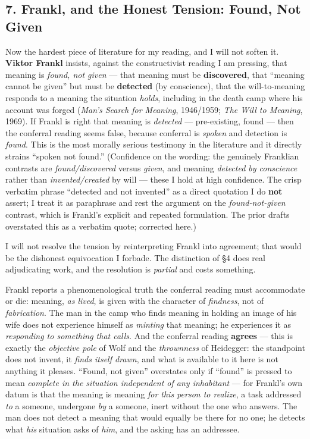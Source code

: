 \documentclass[11pt]{article}
\begin{document}
\subsection*{7. Frankl, and the Honest Tension: Found, Not Given}

Now the hardest piece of literature for my reading, and I will not soften it. \textbf{Viktor Frankl} insists, against the constructivist reading I am pressing, that meaning is \emph{found, not given} — that meaning must be \textbf{discovered}, that ``meaning cannot be given'' but must be \textbf{detected} (by conscience), that the will-to-meaning responds to a meaning the situation \emph{holds}, including in the death camp where his account was forged (\emph{Man's Search for Meaning}, 1946/\allowbreak{}1959; \emph{The Will to Meaning}, 1969). If Frankl is right that meaning is \emph{detected} — pre-existing, found — then the conferral reading seems false, because conferral is \emph{spoken} and detection is \emph{found}. This is the most morally serious testimony in the literature and it directly strains ``spoken not found.'' (Confidence on the wording: the genuinely Franklian contrasts are \emph{found/\allowbreak{}discovered} versus \emph{given}, and meaning \emph{detected by conscience} rather than \emph{invented/\allowbreak{}created} by will — these I hold at high confidence. The crisp verbatim phrase ``detected and not invented'' as a direct quotation I do \textbf{not} assert; I treat it as paraphrase and rest the argument on the \emph{found-not-given} contrast, which is Frankl's explicit and repeated formulation. The prior drafts overstated this as a verbatim quote; corrected here.)

I will not resolve the tension by reinterpreting Frankl into agreement; that would be the dishonest equivocation I forbade. The distinction of §4 does real adjudicating work, and the resolution is \emph{partial} and costs something.

Frankl reports a phenomenological truth the conferral reading must accommodate or die: meaning, \emph{as lived}, is given with the character of \emph{findness}, not of \emph{fabrication}. The man in the camp who finds meaning in holding an image of his wife does not experience himself as \emph{minting} that meaning; he experiences it as \emph{responding to something that calls}. And the conferral reading \textbf{agrees} — this is exactly the \emph{objective pole} of Wolf and the \emph{thrownness} of Heidegger: the standpoint does not invent, it \emph{finds itself drawn}, and what is available to it here is not anything it pleases. ``Found, not given'' overstates only if ``found'' is pressed to mean \emph{complete in the situation independent of any inhabitant} — for Frankl's own datum is that the meaning is meaning \emph{for this person to realize}, a task addressed \emph{to} a someone, undergone \emph{by} a someone, inert without the one who answers. The man does not detect a meaning that would equally be there for no one; he detects what \emph{his} situation asks of \emph{him}, and the asking has an addressee.
\end{document}
